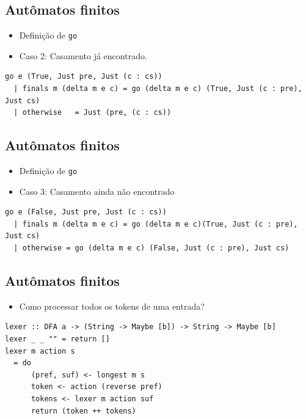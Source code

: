 \documentclass[11pt]{article}
\begin{document}
\subsection*{Autômatos finitos}
\label{sec:orgbdf5076}

\begin{itemize}
\item Definição de \texttt{go}

\item Caso 2: Casamento já encontrado.
\end{itemize}

\begin{verbatim}
go e (True, Just pre, Just (c : cs))
  | finals m (delta m e c) = go (delta m e c) (True, Just (c : pre), Just cs)
  | otherwise   = Just (pre, (c : cs))
\end{verbatim}
\subsection*{Autômatos finitos}
\label{sec:org01565a5}

\begin{itemize}
\item Definição de \texttt{go}

\item Caso 3: Casamento ainda não encontrado
\end{itemize}

\begin{verbatim}
go e (False, Just pre, Just (c : cs))
  | finals m (delta m e c) = go (delta m e c)(True, Just (c : pre), Just cs)
  | otherwise = go (delta m e c) (False, Just (c : pre), Just cs)
\end{verbatim}
\subsection*{Autômatos finitos}
\label{sec:orge931927}

\begin{itemize}
\item Como processar todos os tokens de uma entrada?
\end{itemize}

\begin{verbatim}
lexer :: DFA a -> (String -> Maybe [b]) -> String -> Maybe [b]
lexer _ _ "" = return []
lexer m action s
  = do
      (pref, suf) <- longest m s
      token <- action (reverse pref)
      tokens <- lexer m action suf
      return (token ++ tokens)
\end{verbatim}
\end{document}
